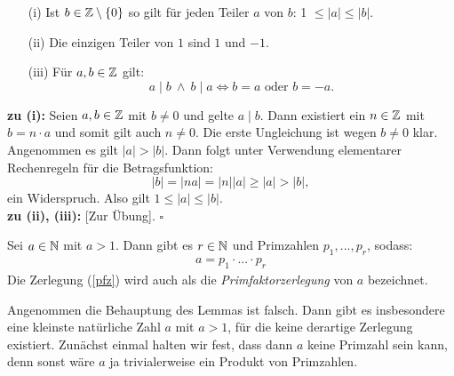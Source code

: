 \begin{frame}
\begin{lemma}
\begin{enumerate}
\item[(i)] Ist $b \in \mathbb{Z} \setminus \{0\}$ so gilt für jeden Teiler $a$ von $b$:
1 $\leq \lvert a \rvert \leq \lvert b \rvert$.

\item[(ii)] Die einzigen Teiler von $1$ sind $1$ und $-1$.

\item[(iii)] Für $a,b \in \mathbb{Z}$ gilt:
\[
  a \mid b \ \wedge \ b \mid a \iff b = a \text{ oder } b = -a.
\]
\end{enumerate}
\end{lemma}

\begin{proof*}
\textbf{zu (i):}
Seien $a,b \in \mathbb{Z}$ mit $b \neq 0$ und gelte $a \mid b$.
Dann existiert ein $n \in \mathbb{Z}$ mit $b = n \cdot a$ und somit gilt auch $n \neq 0$.
Die erste Ungleichung ist wegen $b \neq 0$ klar.
Angenommen es gilt $\lvert a \rvert > \lvert b \rvert$.
Dann folgt unter Verwendung elementarer Rechenregeln für die Betragsfunktion:
\[
  \lvert b \rvert = \lvert n a \rvert = \lvert n \rvert \lvert a \rvert
  \geq \lvert a \rvert > \lvert b \rvert,
\]
ein Widerspruch. Also gilt $1 \leq \lvert a \rvert \leq \lvert b \rvert$.\\
\textbf{zu (ii), (iii):} [Zur Übung].
\hfill $\square$
\end{proof*}
\end{frame}


\begin{frame}
\begin{lemma}
Sei $a \in \mathbb{N}$ mit $a > 1$.
Dann gibt es $r \in \mathbb{N}$ und Primzahlen $p_1,...,p_r$, sodass:
\begin{align}
    a = p_1 \cdot ... \cdot p_r \label{pfz}
\end{align}
Die Zerlegung (\ref{pfz}) wird auch als die \textit{Primfaktorzerlegung} von
$a$ bezeichnet.
\end{lemma}

\begin{proof*}
Angenommen die Behauptung des Lemmas ist falsch.
Dann gibt es insbesondere eine kleinste natürliche Zahl $a$ mit $a>1$,
für die keine derartige Zerlegung existiert.
Zunächst einmal halten wir fest, dass dann $a$ keine Primzahl sein kann,
denn sonst wäre $a$ ja trivialerweise ein Produkt von Primzahlen.
\end{proof*}
\end{frame}

